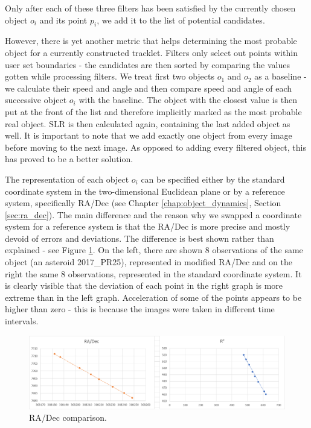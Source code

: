 	Only after each of these three filters has been satisfied by the currently chosen object $o_i$ and its point $p_i$, we add it to the list of potential candidates. 
	
	However, there is yet another metric that helps determining the most probable object for a currently constructed tracklet. Filters only select out points within user set boundaries - the candidates are then sorted by comparing the values gotten while processing filters. We treat first two objects $o_1$ and $o_2$ as a baseline - we calculate their speed and angle and then compare speed and angle of each successive object $o_i$ with the baseline. The object with the closest value is then put at the front of the list and therefore implicitly marked as the most probable real object. SLR is then calculated again, containing the last added object as well. It is important to note that we add exactly one object from every image before moving to the next image. As opposed to adding every filtered object, this has proved to be a better solution.
	
	The representation of each object $o_i$ can be specified either by the standard coordinate system in the two-dimensional Euclidean plane or by a reference system, specifically RA/Dec (see Chapter \ref{chap:object_dynamics}, Section \ref{sec:ra_dec}). The main difference and the reason why we swapped a coordinate system for a reference system is that the RA/Dec is more precise and mostly devoid of errors and deviations. The difference is best shown rather than explained - see Figure \ref{fig:regresia3}. On the left, there are shown 8 observations of the same object (an asteroid 2017\_PR25), represented in modified RA/Dec and on the right the same 8 observations, represented in the standard coordinate system. It is clearly visible that the deviation of each point in the right graph is more extreme than in the left graph. Acceleration of some of the points appears to be higher than zero - this is because the images were taken in different time intervals.
	
	\begin{figure}[H]
	\centering
	  \includegraphics[width=\linewidth]{images/regresia3}
		  \caption{RA/Dec comparison.}
	  \label{fig:regresia3}
	\end{figure}
	
